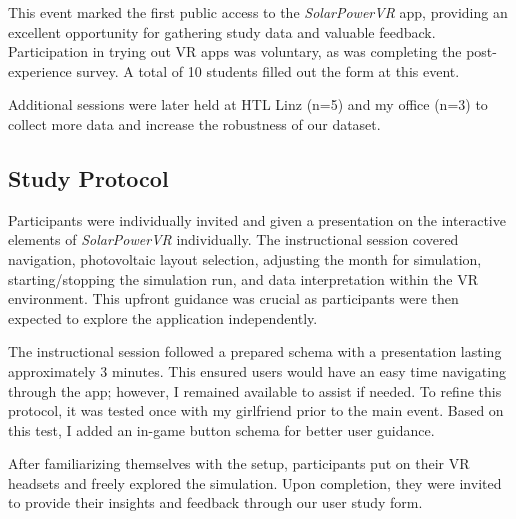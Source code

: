 \documentclass[draft, final]{vutinfth} %
\begin{document}
This event marked the first public access to the \textit{SolarPowerVR} app, providing an excellent opportunity for gathering study data and valuable feedback. Participation in trying out VR apps was voluntary, as was completing the post-experience survey. A total of 10 students filled out the form at this event.

Additional sessions were later held at HTL Linz (n=5) and my office (n=3) to collect more data and increase the robustness of our dataset.

\subsection{Study Protocol}
Participants were individually invited and given a presentation on the interactive elements of \textit{SolarPowerVR} individually. The instructional session covered navigation, photovoltaic layout selection, adjusting the month for simulation, starting/stopping the simulation run, and data interpretation within the VR environment. This upfront guidance was crucial as participants were then expected to explore the application independently.

The instructional session followed a prepared schema with a presentation lasting approximately 3 minutes. This ensured users would have an easy time navigating through the app; however, I remained available to assist if needed. To refine this protocol, it was tested once with my girlfriend prior to the main event. Based on this test, I added an in-game button schema for better user guidance.

After familiarizing themselves with the setup, participants put on their VR headsets and freely explored the simulation. Upon completion, they were invited to provide their insights and feedback through our user study form.
\end{document}
